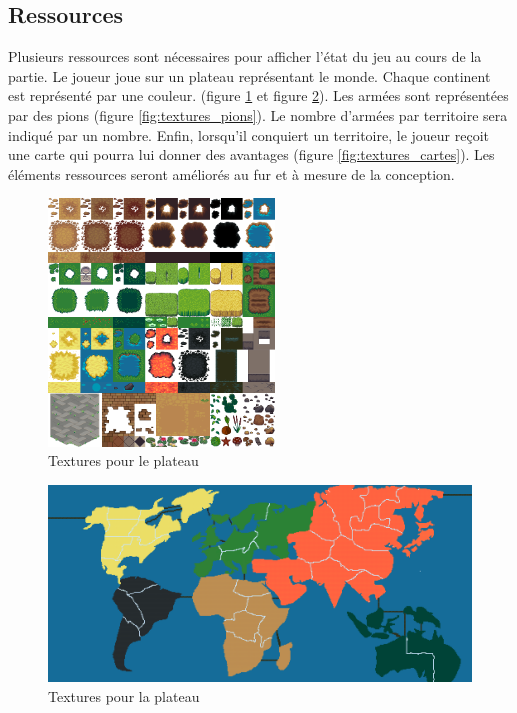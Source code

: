 \subsection{Ressources}
    Plusieurs ressources sont nécessaires pour afficher l'état du jeu au cours de la partie. 
    Le joueur joue sur un plateau représentant le monde. Chaque continent est représenté par une couleur.  (figure \ref{fig:textures_plateau} et figure \ref{fig:textures_plateau2}).  Les armées sont représentées par des pions (figure \ref{fig:textures_pions}). Le nombre d'armées par territoire sera indiqué par un nombre. Enfin, lorsqu'il conquiert un territoire, le joueur reçoit une carte qui pourra lui donner des avantages (figure \ref{fig:textures_cartes}). Les éléments ressources seront améliorés au fur et à mesure de la conception. 
    
    \begin{figure}[!htbp]
        \centering
        \includegraphics[width=6cm]{Images/terrain.png}
        \caption{Textures pour le plateau}
        \label{fig:textures_plateau}
    \end{figure}

    
    \begin{figure}[!htbp]
        \centering
        \includegraphics[width=13cm]{Images/map_jeu.png}
        \caption{Textures pour la plateau}
        \label{fig:textures_plateau2}
    \end{figure}
    
